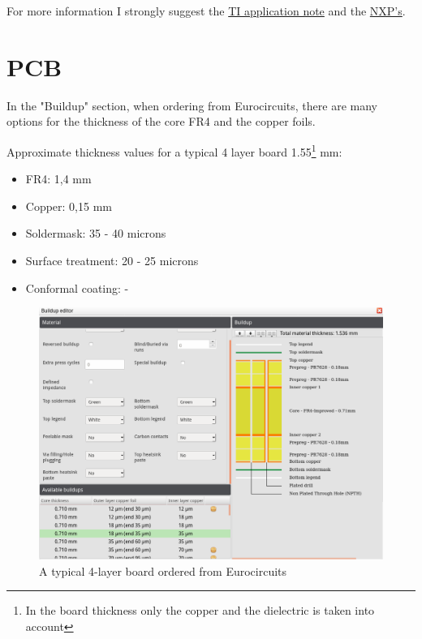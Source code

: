 \documentclass[final]{cubedoc}
\begin{document}
	
	For more information I strongly suggest the \href{https://www.ti.com/lit/an/spra953c/spra953c.pdf}{TI application note} and the \href{https://www.nxp.com/docs/en/white-paper/BasicThermalWP.pdf}{NXP's}.
	
	\pagebreak
	\section{PCB}
	
	In the "Buildup" section, when ordering from Eurocircuits, there are many options for the thickness of the core FR4 and the copper foils.
	
	Approximate thickness values for a typical 4 layer board 1.55\footnote{In the board thickness only the copper and the dielectric is taken into account} mm:
	\begin{itemize}
		\item FR4:  1,4 mm
		\item Copper:  0,15 mm
		\item Soldermask: 35 - 40 microns
		\item Surface treatment: 20 - 25 microns
		\item Conformal coating: -
	\end{itemize}
	
	
	\begin{figure}[h!]
		\centering
		\includegraphics[keepaspectratio, height=0.4\textheight, width=\textwidth]{docs/stackup.png}
		\caption{A typical 4-layer board ordered from Eurocircuits}
		\label{fig:my_label}
	\end{figure}{}
	
\end{document}
